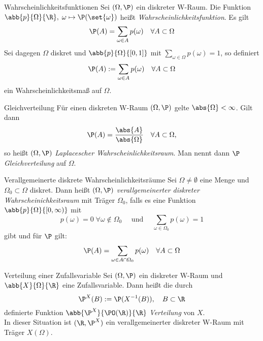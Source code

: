 \begin{karte}{Wahrscheinlichkeitsfunktionen}
	Sei $(\Omega, \P)$ ein diskreter W-Raum. Die Funktion $\abb{p}{\Omega}{\R},\; \omega \mapsto \P(\set{\omega})$ heißt \textit{Wahrscheinlichkeitsfunktion}. Es gilt
	$$ \P(A) = \sum_{\omega \in A} p(\omega) \quad \forall A \subset \Omega$$
	Sei dagegen $\Omega$ diskret und $\abb{p}{\Omega}{[0,1]}$ mit $\displaystyle \sum_{\omega \in \Omega} p(\omega) = 1$, so definiert
	$$ \P(A) := \sum_{\omega \in A} p(\omega) \quad \forall A \subset \Omega$$ ein Wahrscheinlichkeitsmaß auf $\Omega$.
\end{karte}

\begin{karte}{Gleichverteilung}
	Für einen diskreten W-Raum $(\Omega,\P)$ gelte $\abs{\Omega} < \infty$. Gilt dann $$\P(A) = \frac{\abs{A}}{\abs{\Omega}} \quad \forall A \subset \Omega \text{,}$$ so heißt $(\Omega,\P)$ \textit{Laplacescher Wahrscheinlichkeitsraum}. Man nennt dann $\P$ \textit{Gleichverteilung} auf $\Omega$.
\end{karte}

\begin{karte}{Verallgemeinerte diskrete Wahrscheinlichkeitsräume}
	Sei $\Omega \neq \emptyset$ eine Menge und $\Omega_0 \subset \Omega$ diskret. Dann heißt $(\Omega,\P)$ \textit{verallgemeinerter diskreter Wahrscheinichkeitsraum} mit Träger $\Omega_0$, falls es eine Funktion $\abb{p}{\Omega}{[0,\infty)}$ mit 
	$$p(\omega)=0 \; \forall \omega \notin \Omega_0 \quad \text{ und } \quad \sum_{\omega \in \Omega_0} p(\omega) =1$$
	gibt und für $\P$ gilt:
	$$\P(A)=\sum_{\omega \in A \cap \Omega_0} p(\omega) \quad \forall A \subset \Omega$$
\end{karte}

\begin{karte}{Verteilung einer Zufallsvariable}
	Sei $(\Omega,\P)$ ein diskreter W-Raum und $\abb{X}{\Omega}{\R}$ eine Zufallsvariable. Dann heißt die durch
	$$\P^X(B):=\P(X^{-1}(B)), \quad B \subset \R$$ definierte Funktion $\abb{\P^X}{\PO(\R)}{\R}$ \textit{Verteilung} von $X$. \\
	In dieser Situation ist $(\R,\P^X)$ ein verallgemeinerter diskreter W-Raum mit Träger $X(\Omega)$.
\end{karte}
